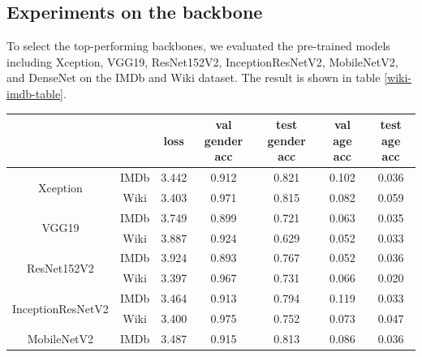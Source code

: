 \documentclass[DIV=calc, paper=a4, fontsize=10pt, twocolumn]{article}
\begin{document}
	\subsection{Experiments on the backbone}\label{sec:backbone}
	To select the top-performing backbones, we evaluated the pre-trained models including Xception, VGG19, ResNet152V2, InceptionResNetV2, MobileNetV2, and DenseNet on the IMDb and Wiki dataset. The result is shown in table \ref{wiki-imdb-table}.
	
	\begin{table}[t]
		\centering
		\begin{tabular}{ccccccc}
			\hline
			\multicolumn{2}{c}{}                                                                & loss  & val gender acc & test gender acc & val age acc & test age acc \\ \hline
			\multicolumn{1}{c|}{\multirow{2}{*}{Xception}}          & \multicolumn{1}{c|}{IMDb} & 3.442 & 0.912          & 0.821           & 0.102       & 0.036        \\ \cline{2-2}
			\multicolumn{1}{c|}{}                                   & \multicolumn{1}{c|}{Wiki} & 3.403 & 0.971          & 0.815           & 0.082       & 0.059        \\ \cline{1-2}
			\multicolumn{1}{c|}{\multirow{2}{*}{VGG19}}             & \multicolumn{1}{c|}{IMDb} & 3.749 & 0.899          & 0.721           & 0.063       & 0.035        \\ \cline{2-2}
			\multicolumn{1}{c|}{}                                   & \multicolumn{1}{c|}{Wiki} & 3.887 & 0.924          & 0.629           & 0.052       & 0.033        \\ \cline{1-2}
			\multicolumn{1}{c|}{\multirow{2}{*}{ResNet152V2}}       & \multicolumn{1}{c|}{IMDb} & 3.924 & 0.893          & 0.767           & 0.052       & 0.036        \\ \cline{2-2}
			\multicolumn{1}{c|}{}                                   & \multicolumn{1}{c|}{Wiki} & 3.397 & 0.967          & 0.731           & 0.066       & 0.020        \\ \cline{1-2}
			\multicolumn{1}{c|}{\multirow{2}{*}{InceptionResNetV2}} & \multicolumn{1}{c|}{IMDb} & 3.464 & 0.913          & 0.794           & 0.119       & 0.033        \\ \cline{2-2}
			\multicolumn{1}{c|}{}                                   & \multicolumn{1}{c|}{Wiki} & 3.400 & 0.975          & 0.752           & 0.073       & 0.047        \\ \cline{1-2}
			\multicolumn{1}{c|}{\multirow{2}{*}{MobileNetV2}}       & \multicolumn{1}{c|}{IMDb} & 3.487 & 0.915          & 0.813           & 0.086       & 0.036        \\ \cline{2-2}

\end{tabular}
\end{table}
\end{document}
